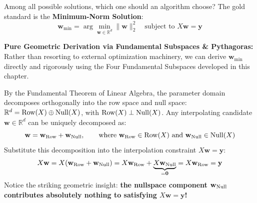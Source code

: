 Among all possible solutions, which one should an algorithm choose?
The gold standard is the \textbf{Minimum-Norm Solution}:
\begin{equation}
\mathbf{w}_{\text{min}} = \arg\min_{\mathbf{w} \in \mathbb{R}^d} \|\mathbf{w}\|_2^2 \quad \text{subject to } X\mathbf{w} = \mathbf{y}
\end{equation}

\textbf{Pure Geometric Derivation via Fundamental Subspaces \& Pythagoras:}
Rather than resorting to external optimization machinery, we can derive $\mathbf{w}_{\text{min}}$ directly and rigorously using the Four Fundamental Subspaces developed in this chapter.

By the Fundamental Theorem of Linear Algebra, the parameter domain decomposes orthogonally into the row space and null space: $\mathbb{R}^d = \operatorname{Row}(X) \oplus \operatorname{Null}(X)$, with $\operatorname{Row}(X) \perp \operatorname{Null}(X)$. Any interpolating candidate $\mathbf{w} \in \mathbb{R}^d$ can be uniquely decomposed as:
\begin{equation}
\mathbf{w} = \mathbf{w}_{\operatorname{Row}} + \mathbf{w}_{\operatorname{Null}}, \qquad \text{where } \mathbf{w}_{\operatorname{Row}} \in \operatorname{Row}(X) \text{ and } \mathbf{w}_{\operatorname{Null}} \in \operatorname{Null}(X)
\end{equation}
Substitute this decomposition into the interpolation constraint $X\mathbf{w} = \mathbf{y}$:
\begin{equation}
X\mathbf{w} = X(\mathbf{w}_{\operatorname{Row}} + \mathbf{w}_{\operatorname{Null}}) = X\mathbf{w}_{\operatorname{Row}} + \underbrace{X\mathbf{w}_{\operatorname{Null}}}_{= \mathbf{0}} = X\mathbf{w}_{\operatorname{Row}} = \mathbf{y}
\end{equation}
Notice the striking geometric insight: \textbf{the nullspace component $\mathbf{w}_{\operatorname{Null}}$ contributes absolutely nothing to satisfying $X\mathbf{w} = \mathbf{y}$!}

